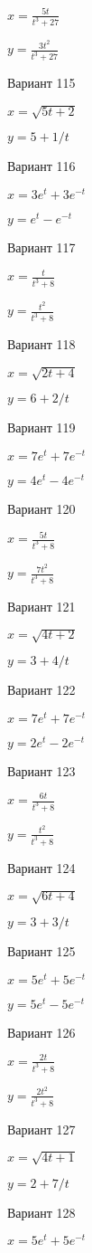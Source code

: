 \documentclass[11pt]{report}
\begin{document}
$x = \frac{5 t}{t^{3} + 27}$

$y = \frac{3 t^{2}}{t^{3} + 27}$

Вариант 115

$x = \sqrt{5 t + 2}$

$y = 5 + 1 / t$

Вариант 116

$x = 3 e^{t} + 3 e^{- t}$

$y = e^{t} - e^{- t}$

Вариант 117

$x = \frac{t}{t^{3} + 8}$

$y = \frac{t^{2}}{t^{3} + 8}$

Вариант 118

$x = \sqrt{2 t + 4}$

$y = 6 + 2 / t$

Вариант 119

$x = 7 e^{t} + 7 e^{- t}$

$y = 4 e^{t} - 4 e^{- t}$

Вариант 120

$x = \frac{5 t}{t^{3} + 8}$

$y = \frac{7 t^{2}}{t^{3} + 8}$

Вариант 121

$x = \sqrt{4 t + 2}$

$y = 3 + 4 / t$

Вариант 122

$x = 7 e^{t} + 7 e^{- t}$

$y = 2 e^{t} - 2 e^{- t}$

Вариант 123

$x = \frac{6 t}{t^{3} + 8}$

$y = \frac{t^{2}}{t^{3} + 8}$

Вариант 124

$x = \sqrt{6 t + 4}$

$y = 3 + 3 / t$

Вариант 125

$x = 5 e^{t} + 5 e^{- t}$

$y = 5 e^{t} - 5 e^{- t}$

Вариант 126

$x = \frac{2 t}{t^{3} + 8}$

$y = \frac{2 t^{2}}{t^{3} + 8}$

Вариант 127

$x = \sqrt{4 t + 1}$

$y = 2 + 7 / t$

Вариант 128

$x = 5 e^{t} + 5 e^{- t}$
\end{document}
